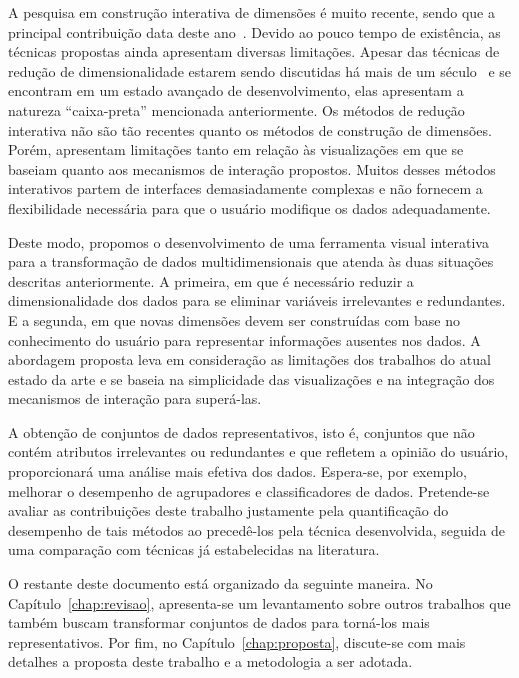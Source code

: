 A pesquisa em construção interativa de dimensões é muito
recente, sendo que a principal contribuição data deste
ano~\cite{Gladys2013}. Devido ao pouco tempo de existência,
as técnicas propostas ainda apresentam diversas limitações.
Apesar das técnicas de redução de dimensionalidade estarem
sendo discutidas há mais de um século~\cite{Pearson1901} e
se encontram em um estado avançado de desenvolvimento, elas
apresentam a natureza ``caixa-preta'' mencionada
anteriormente.  Os métodos de redução interativa não são tão
recentes quanto os métodos de construção de dimensões.
Porém, apresentam limitações tanto em relação às
visualizações em que se baseiam quanto aos mecanismos de
interação propostos.  Muitos desses métodos interativos
partem de interfaces demasiadamente complexas e não fornecem
a flexibilidade necessária para que o usuário modifique os
dados adequadamente.

Deste modo, propomos o desenvolvimento de uma ferramenta
visual interativa para a transformação de dados
multidimensionais que atenda às duas situações descritas
anteriormente. A primeira, em que é necessário reduzir a
dimensionalidade dos dados para se eliminar variáveis
irrelevantes e redundantes. E a segunda, em que novas
dimensões devem ser construídas com base no conhecimento do
usuário para representar informações ausentes nos dados. A
abordagem proposta leva em consideração as limitações dos
trabalhos do atual estado da arte e se baseia na
simplicidade das visualizações e na integração  dos
mecanismos de interação para superá-las. 

A obtenção de conjuntos de dados representativos, isto é,
conjuntos que não contém atributos irrelevantes ou
redundantes e que refletem a opinião do usuário,
proporcionará uma análise mais efetiva dos dados. Espera-se,
por exemplo, melhorar o desempenho de agrupadores e
classificadores de dados. Pretende-se avaliar as
contribuições deste trabalho justamente pela quantificação
do desempenho de tais métodos ao precedê-los pela técnica
desenvolvida, seguida de uma comparação com técnicas já
estabelecidas na literatura.


O restante deste documento está organizado da seguinte
maneira. No Capítulo~\ref{chap:revisao}, apresenta-se um
levantamento sobre outros trabalhos que também buscam
transformar conjuntos de dados para torná-los mais
representativos. Por fim, no Capítulo~\ref{chap:proposta},
discute-se com mais detalhes a proposta deste trabalho e a
metodologia a ser adotada. 

